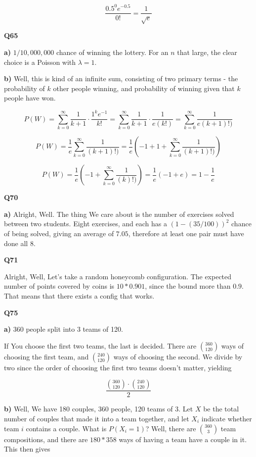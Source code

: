 \documentclass{article}
\begin{document}
		\[ \frac{0.5^0 e^{-0.5}}{0!} = \frac{1}{\sqrt{e}} \]
		
		\hfill
		
		\textbf{Q65}
		
		\textbf{a)} $1/10,000,000$ chance of winning the lottery. For an $n$ that large, the clear choice is a Poisson with $\lambda = 1$.
		
		\textbf{b)} Well, this is kind of an infinite sum, consisting of two primary terms - the probability of $k$ other people winning, and probability of winning given that $k$ people have won. 
		
		\[P(W) = \sum^\infty_{k=0}  \frac{1}{k+1}\cdot \frac{1^ke^{-1}}{k!} = \sum^\infty_{k=0}  \frac{1}{k+1}\cdot \frac{1}{e(k!)} = \sum^\infty_{k=0}  \frac{1}{e(k+1)!)} \]
		
		\[ P(W) = \frac{1}{e}\sum^\infty_{k=0}  \frac{1}{(k+1)!)} = \frac{1}{e}\left(-1+1+\sum^\infty_{k=0}  \frac{1}{(k+1)!)}\right) \]
		
		\[ P(W) = \frac{1}{e}\left(-1+\sum^\infty_{k=0}  \frac{1}{(k)!)}\right) = \frac{1}{e}(-1+e) = 1 - \frac{1}{e} \]
		
		\hfill
		
		\textbf{Q70}
		
		\textbf{a)} Alright, Well. The thing We care about is the number of exercises solved between two students. Eight exercises, and each has a $(1-(35/100))^2$ chance of being solved, giving an average of $7.05$, therefore at least one pair must have done all 8.
		
		\hfill
		
		\textbf{Q71}
		
		Alright, Well, Let's take a random honeycomb configuration. The expected number of points covered by coins is $10*0.901$, since the bound  more than $0.9$. That means that there exists a config that works. 
		
		\hfill
		
		\textbf{Q75}
		
		\textbf{a)} 360 people split into 3 teams of 120. 
		
		If You choose the first two teams, the last is decided. There are ${360\choose 120}$ ways of choosing the first team, and ${240\choose 120}$ ways of choosing the second. We divide by two since the order of choosing the first two teams doesn't matter, yielding
		
		\[ \frac{{360\choose 120}\cdot{240\choose 120}}{2} \]
		
		\textbf{b)} Well, We have 180 couples, 360 people, 120 teams of 3. Let $X$ be the total number of couples that made it into a team together, and let $X_i$ indicate whether team $i$ contains a couple. What is $P(X_i =1)$? Well, there are ${360\choose 3}$ team compositions, and there are $180*358$ ways of having a team have a couple in it. This then gives
		
\end{document}
